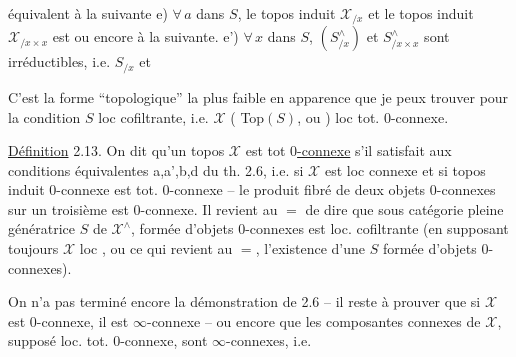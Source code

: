 \reversemarginpar{}\normalmarginpar

équivalent  à la suivante e) $\forall\,a$ dans $S$, le  topos induit $\mathscr X_{/x}$  et le topos induit  $\mathscr X_{/x\times x}$ est   ou encore à la suivante. e') $\forall\,x$ dans $S$, $(S^\wedge_{/x})$  et $S^\wedge_{/x\times x}$  sont irréductibles, i.e. $S_{/x}$ et  

\reversemarginpar{}\normalmarginpar

C'est la forme ``topologique'' la plus faible en apparence que je peux trouver pour la condition $S$ loc cofiltrante, i.e. $\mathscr X$ (  Top$(S)$, ou )  loc tot.  $0$-connexe.

\uline{Définition} 2.13. On dit qu'un topos $\mathscr X$ est \uline{} tot \uline{$0$-connexe} s'il satisfait aux conditions équivalentes a,a',b,d du th. 2.6, i.e. si $\mathscr X$ est loc connexe et si   topos induit $0$-connexe est tot. $0$-connexe --   le produit fibré de deux objets $0$-connexes sur un troisième est $0$-connexe. Il revient au $=$ de dire que   sous catégorie pleine génératrice $S$ de $\mathscr X^\wedge$, formée d'objets $0$-connexes est loc. cofiltrante (en supposant toujours $\mathscr X$ loc , ou ce qui revient au $=$, l'existence d'une $S$ formée d'objets $0$-connexes).

\reversemarginpar{}\normalmarginpar

 On n'a pas terminé encore la démonstration de 2.6 -- il reste à prouver  que si $\mathscr X$ est $0$-connexe, il est $\infty$-connexe -- ou encore que les composantes connexes de $\mathscr X$, supposé loc. tot. $0$-connexe, sont $\infty$-connexes, i.e. 

